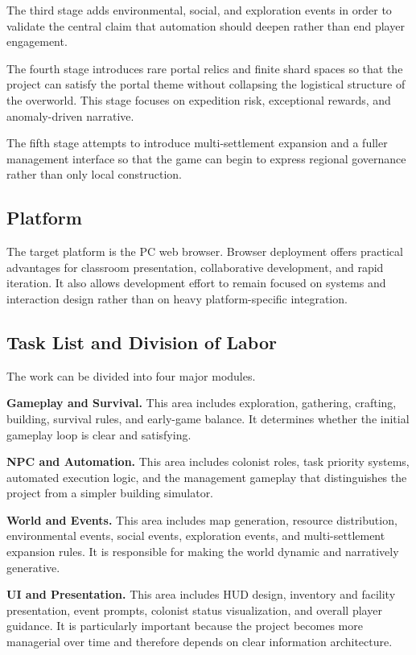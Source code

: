\documentclass[conference]{IEEEtran}
\begin{document}
The third stage adds environmental, social, and exploration events in order to validate the central claim that automation should deepen rather than end player engagement.

The fourth stage introduces rare portal relics and finite shard spaces so that the project can satisfy the portal theme without collapsing the logistical structure of the overworld. This stage focuses on expedition risk, exceptional rewards, and anomaly-driven narrative.

The fifth stage attempts to introduce multi-settlement expansion and a fuller management interface so that the game can begin to express regional governance rather than only local construction.

\subsection{Platform}
The target platform is the PC web browser. Browser deployment offers practical advantages for classroom presentation, collaborative development, and rapid iteration. It also allows development effort to remain focused on systems and interaction design rather than on heavy platform-specific integration.

\subsection{Task List and Division of Labor}
The work can be divided into four major modules.

\textbf{Gameplay and Survival.} This area includes exploration, gathering, crafting, building, survival rules, and early-game balance. It determines whether the initial gameplay loop is clear and satisfying.

\textbf{NPC and Automation.} This area includes colonist roles, task priority systems, automated execution logic, and the management gameplay that distinguishes the project from a simpler building simulator.

\textbf{World and Events.} This area includes map generation, resource distribution, environmental events, social events, exploration events, and multi-settlement expansion rules. It is responsible for making the world dynamic and narratively generative.

\textbf{UI and Presentation.} This area includes HUD design, inventory and facility presentation, event prompts, colonist status visualization, and overall player guidance. It is particularly important because the project becomes more managerial over time and therefore depends on clear information architecture.
\end{document}
